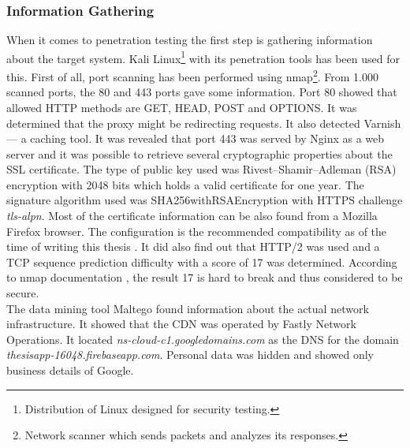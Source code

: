 \documentclass{article} %
\begin{document}
\subsubsection{Information Gathering}
When it comes to penetration testing the first step is gathering information about the target system. Kali Linux\footnote{Distribution of Linux designed for security testing.} with its penetration tools has been used for this. First of all, port scanning has been performed using nmap\footnote{Network scanner which sends packets and analyzes its responses.}. From 1.000 scanned ports, the 80 and 443 ports gave some information. Port 80 showed that allowed HTTP methods are GET, HEAD, POST and OPTIONS. It was determined that the proxy might be redirecting requests. It also detected Varnish --- a caching tool. It was revealed that port 443 was served by Nginx as a web server and it was possible to retrieve several cryptographic properties about the SSL certificate. The type of public key used was Rivest–Shamir–Adleman (RSA) encryption with 2048 bits which holds a valid certificate for one year. The signature algorithm used was SHA256withRSAEncryption with HTTPS challenge \textit{tls-alpn}. Most of the certificate information can be also found from a Mozilla Firefox browser. The configuration is the recommended compatibility as of the time of writing this thesis \cite{bib:ssl_compatibility}.  It did also find out that HTTP/2 was used and a TCP sequence prediction difficulty with a score of 17 was determined. According to nmap documentation \cite{bib:nmap_documentation, bib:nmap_source_code}, the result 17 is hard to break and thus considered to be secure.\\
\newline
The data mining tool Maltego found information about the actual network infrastructure. It showed that the CDN was operated by Fastly Network Operations. It located \textit{ns-cloud-c1.googledomains.com} as the DNS for the domain \textit{thesisapp-16048.firebaseapp.com}. Personal data was hidden and showed only business details of Google.\\
\end{document}
